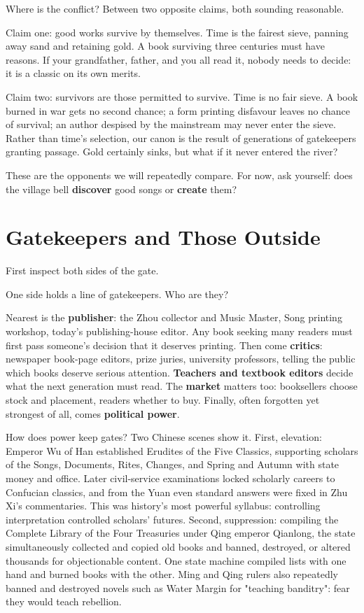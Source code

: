 Where is the conflict? Between two opposite claims, both sounding reasonable.

Claim one: good works survive by themselves. Time is the fairest sieve, panning away sand and retaining gold. A book surviving three centuries must have reasons. If your grandfather, father, and you all read it, nobody needs to decide: it is a classic on its own merits.

Claim two: survivors are those permitted to survive. Time is no fair sieve. A book burned in war gets no second chance; a form printing disfavour leaves no chance of survival; an author despised by the mainstream may never enter the sieve. Rather than time's selection, our canon is the result of generations of gatekeepers granting passage. Gold certainly sinks, but what if it never entered the river?

These are the opponents we will repeatedly compare. For now, ask yourself: does the village bell \textbf{discover} good songs or \textbf{create} them?

\section{Gatekeepers and Those Outside}
First inspect both sides of the gate.

One side holds a line of gatekeepers. Who are they?

Nearest is the \textbf{publisher}: the Zhou collector and Music Master, Song printing workshop, today's publishing-house editor. Any book seeking many readers must first pass someone's decision that it deserves printing. Then come \textbf{critics}: newspaper book-page editors, prize juries, university professors, telling the public which books deserve serious attention. \textbf{Teachers and textbook editors} decide what the next generation must read. The \textbf{market} matters too: booksellers choose stock and placement, readers whether to buy. Finally, often forgotten yet strongest of all, comes \textbf{political power}.

How does power keep gates? Two Chinese scenes show it. First, elevation: Emperor Wu of Han established Erudites of the Five Classics, supporting scholars of the Songs, Documents, Rites, Changes, and Spring and Autumn with state money and office. Later civil-service examinations locked scholarly careers to Confucian classics, and from the Yuan even standard answers were fixed in Zhu Xi's commentaries. This was history's most powerful syllabus: controlling interpretation controlled scholars' futures. Second, suppression: compiling the Complete Library of the Four Treasuries under Qing emperor Qianlong, the state simultaneously collected and copied old books and banned, destroyed, or altered thousands for objectionable content. One state machine compiled lists with one hand and burned books with the other. Ming and Qing rulers also repeatedly banned and destroyed novels such as Water Margin for "teaching banditry": fear they would teach rebellion.

